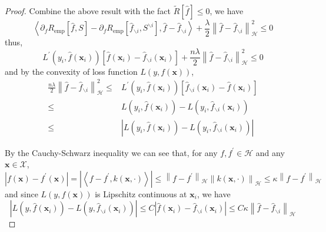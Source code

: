 \documentclass[a4paper, 12pt, mtpro2, authoryear]{elegantpaper}
\begin{document}
\begin{proof}
    Combine the above result with the fact $\tilde{R}[\hat{f}]\leq 0$, we have
    \begin{equation}
        \left\langle\partial_{f}R_{\text{emp}}\left[\hat{f},S\right]-\partial_{f}R_{\text{emp}}\left[\hat{f}_{\backslash i},S^{\backslash i}\right],\hat{f}-\hat{f}_{\backslash i}\right\rangle+\frac{\lambda}{2}\left\|\hat{f}-\hat{f}_{\backslash i}\right\|_{\mathcal{H}}^{2}\leq 0
    \end{equation}
    thus,
    \begin{equation}
        L^{\prime}\left(y_{i},\hat{f}(\mathbf{x}_{i})\right)\left[\hat{f}(\mathbf{x}_{i})-\hat{f}_{\backslash i}(\mathbf{x}_{i})\right]+\frac{n\lambda}{2}\left\|\hat{f}-\hat{f}_{\backslash i}\right\|_{\mathcal{H}}^{2}\leq 0
    \end{equation}
    and by the convexity of loss function $L\left(y,f(\mathbf{x})\right)$,
    \begin{equation}
        \label{eq:rkhs-norm-by-derviative-of-tilde-R}
        \begin{aligned}
            \frac{n\lambda}{2}\left\|\hat{f}-\hat{f}_{\backslash i}\right\|_{\mathcal{H}}^{2}\leq & L^{\prime}\left(y_{i},\hat{f}(\mathbf{x}_{i})\right)\left[\hat{f}_{\backslash i}(\mathbf{x}_{i})-\hat{f}(\mathbf{x}_{i})\right] \\
            \leq                                                                                  & L\left(y_{i},\hat{f}(\mathbf{x}_{i})\right)-L\left(y_{i},\hat{f}_{\backslash i}(\mathbf{x}_{i})\right)                          \\
            \leq                                                                                  & \left|L\left(y_{i},\hat{f}(\mathbf{x}_{i})\right)-L\left(y_{i},\hat{f}_{\backslash i}(\mathbf{x}_{i})\right)\right|
        \end{aligned}
    \end{equation}

    By the Cauchy-Schwarz inequality we can see that, for any $f,f^{\prime}\in\mathcal{H}$ and any $\mathbf{x}\in\mathcal{X}$,
    \begin{equation}
        \left|f(\mathbf{x})-f^{\prime}(\mathbf{x})\right|=\left|\left\langle f-f^{\prime},k(\mathbf{x},\cdot)\right\rangle\right|\leq\left\|f-f^{\prime}\right\|_{\mathcal{H}}\left\|k(\mathbf{x},\cdot)\right\|_{\mathcal{H}}\leq\kappa\left\|f-f^{\prime}\right\|_{\mathcal{H}}
    \end{equation}
    and since $L\left(y,f(\mathbf{x})\right)$ is Lipschitz continuous at $\mathbf{x}_{i}$,  we have
    \begin{equation}
        \label{eq:rkhs-norm-by-lipshitz-continuous}
        \left|L\left(y,\hat{f}(\mathbf{x}_{i})\right)-L\left(y,\hat{f}_{\backslash i}(\mathbf{x}_{i})\right)\right|\leq C\left|\hat{f}(\mathbf{x}_{i})-\hat{f}_{\backslash i}(\mathbf{x}_{i})\right|\leq C\kappa\left\|\hat{f}-\hat{f}_{\backslash i}\right\|_{\mathcal{H}}
    \end{equation}


\end{proof}
\end{document}
